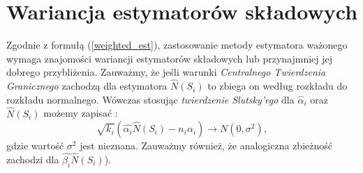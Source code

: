 \section{Wariancja estymatorów składowych}

Zgodnie z formułą (\ref{weighted_est}), zastosowanie metody estymatora ważonego wymaga znajomości wariancji  estymatorów składowych lub przynajmniej jej dobrego przybliżenia.
Zauważmy, że jeśli warunki \textit{Centralnego Twierdzenia Granicznego} zachodzą dla estymatora $\hat{N}(S_i)$ to zbiega on według rozkładu do rozkładu normalnego. Wówczas stosując \textit{twierdzenie Slutsky'ego} dla $\hat{\alpha}_i$ oraz $\hat{N}(S_i)$
możemy zapisać \cite{ting}:
\begin{equation}
    \sqrt{k_i}(\hat{{\alpha}_i}\hat{N}(S_i) - n_{i}{\alpha}_{i}) \rightarrow N(0, \sigma^2),
\end{equation}
gdzie wartość $\sigma^2$ jest nieznana.
Zauważmy również, że analogiczna zbieżność zachodzi dla  $\hat{{\beta}_i}\hat{N}(S_i)$).

